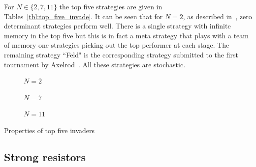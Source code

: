 \documentclass{article}
\begin{document}
For \(N\in\{2, 7, 11\}\) the top five strategies are given in
Tables~\ref{tbl:top_five_invade}. It can be seen that for \(N=2\), as described
in~\cite{Press2012}, zero determinant strategies perform well. There is a
single strategy with infinite memory in the top five but this is in fact a meta
strategy that plays with a team of memory one strategies picking out the top
performer at each stage. The remaining strategy ``Feld" is the corresponding
strategy submitted to the first tournament by Axelrod~\cite{Axelrod1980a}. All
these strategies are stochastic.

\begin{table}[!hbtp]
    \begin{subfigure}[t]{\textwidth}
        \centering
        
        \caption{\(N=2\)}
    \end{subfigure}
    \begin{subfigure}[t]{\textwidth}
        \centering
        
        \caption{\(N=7\)}
    \end{subfigure}
    \begin{subfigure}[t]{\textwidth}
        \centering
        
        \caption{\(N=11\)}
    \end{subfigure}
    \caption{Properties of top five invaders}
    \label{tbl:top_five_invade}
\end{table}


\subsection{Strong resistors}\label{sec:strong_resistors}
\end{document}
